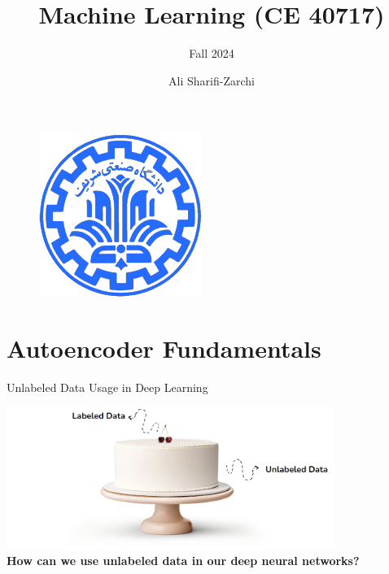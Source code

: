 \documentclass[serif, aspectratio=169]{beamer}
\author{Ali Sharifi-Zarchi}
\title{Machine Learning (CE 40717)}
\subtitle{Fall 2024}
\institute{
    CE Department \\
    Sharif University of Technology
}
\begin{document}
\begin{frame}
    \titlepage
    \vspace*{-0.6cm}
    \begin{figure}[htpb]
        \begin{center}
            \includegraphics[keepaspectratio, scale=0.25]{pic/sharif-main-logo.png}
        \end{center}
    \end{figure}
\end{frame}

\begin{frame}    
\tableofcontents[sectionstyle=show,
subsectionstyle=show/shaded/hide,
subsubsectionstyle=show/shaded/hide]
\end{frame}


\section{Autoencoder Fundamentals}

\begin{frame}{Unlabeled Data Usage in Deep Learning}
\begin{center}
    \includegraphics[width=0.8\textwidth]{pic/Cherry on top.png}
    \\
    \textbf{How can we use unlabeled data in our deep neural networks?}

    \vfill

\end{center}
    
\end{frame}
\end{document}

